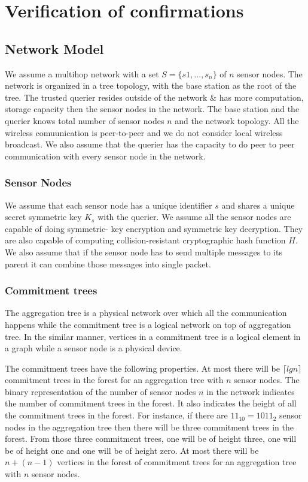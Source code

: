 \chapter{Verification of confirmations}

\section{Network Model}

We assume a multihop network with a set $ S = \{s1,...,s_{n}\} $ of $n$
sensor nodes. The network is organized in a tree topology, with the
base station as the root of the tree. The trusted querier resides
outside of the network \& has more computation, storage capacity 
then the sensor nodes in the network. The base station and the 
querier knows total number of sensor nodes $n$ and the network 
topology. All the wireless comuunication is peer-to-peer and we do 
not consider local wireless broadcast. We also assume that the
querier has the capacity to do peer to peer communication with 
every sensor node in the network.

\subsection{Sensor Nodes}

	We assume that each sensor node has a unique identifier $s$ and
	shares a unique secret symmetric key $K_{s}$ with the querier. 
	We assume all the sensor nodes are capable of doing symmetric-
	key encryption and symmetric key decryption. They are also
	capable of computing collision-resistant cryptographic hash 
	function $H$. We also assume that if the sensor node has to send 
	multiple messages to its parent it can combine those messages 
	into single packet.

\subsection{Commitment trees} %
\label{sub:Commitment trees}
		
	The aggregation tree is a physical network over which all the
	communication happens while the commitment tree is a logical
	network on top of aggregation tree. In the similar manner, 
	vertices in a commitment tree is a logical element in a graph 
	while a sensor node is a physical device. 

	The commitment trees have the following properties. 
	At most there will be $\lceil lg  n \rceil$ commitment trees in the forest for an aggregation tree with $n$ sensor nodes.
	The binary representation of the number of sensor nodes $n$ in the network indicates the number of commitment trees in the forest. It also indicates the height of all the commitment trees in the forest. 
	For instance, if there are $ 11_{10} = 1011_{2} $ sensor nodes in the aggregation tree then there will be three commitment trees in the forest. From those three commitment trees, one will be of height three, one will be of height one and one will be of height zero.
	At most there will be $n + ( n - 1 )$ vertices in the forest of commitment trees for an aggregation tree with $n$ sensor 
	nodes.

